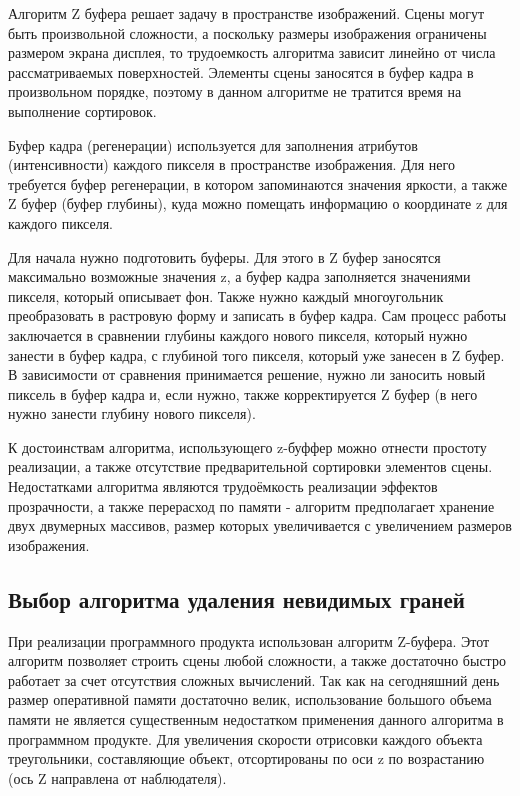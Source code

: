 \begin{figure}[ht!]
\end{figure}

Алгоритм Z буфера решает задачу в пространстве изображений. Сцены могут быть произвольной сложности, а поскольку размеры изображения ограничены размером экрана дисплея, то трудоемкость алгоритма зависит линейно от числа рассматриваемых поверхностей. Элементы сцены заносятся в буфер кадра в произвольном порядке, поэтому в данном алгоритме не тратится время на выполнение сортировок.

Буфер кадра (регенерации) используется для заполнения атрибутов (интенсивности) каждого пикселя в пространстве изображения. Для него требуется буфер регенерации, в котором запоминаются значения яркости, а также Z буфер (буфер глубины), куда можно помещать информацию о координате z для каждого пикселя.

Для начала нужно подготовить буферы. Для этого в Z буфер заносятся максимально возможные значения z, а буфер кадра заполняется значениями пикселя, который описывает фон. Также нужно каждый многоугольник преобразовать в растровую форму и записать в буфер кадра. Сам процесс работы заключается в сравнении глубины каждого нового пикселя, который нужно занести в буфер кадра, с глубиной того пикселя, который уже занесен в Z буфер. В зависимости от сравнения принимается решение, нужно ли заносить новый пиксель в буфер кадра и, если нужно, также корректируется Z буфер (в него нужно занести глубину нового пикселя).

К достоинствам алгоритма, использующего z-буффер можно отнести простоту реализации, а также отсутствие предварительной сортировки элементов сцены. Недостатками алгоритма являются трудоёмкость реализации эффектов прозрачности, а также перерасход по памяти - алгоритм предполагает хранение двух двумерных массивов, размер которых увеличивается с увеличением размеров изображения.




\subsection{Выбор алгоритма удаления невидимых граней}
При реализации программного продукта использован алгоритм Z-буфера. Этот алгоритм позволяет строить сцены любой сложности, а также достаточно быстро работает за счет отсутствия сложных вычислений. 
Так как на сегодняшний день размер оперативной памяти достаточно велик, использование большого объема памяти не является существенным недостатком применения данного алгоритма в программном продукте.
Для увеличения скорости отрисовки каждого объекта треугольники, составляющие объект, отсортированы по оси z по возрастанию (ось Z направлена от наблюдателя).




